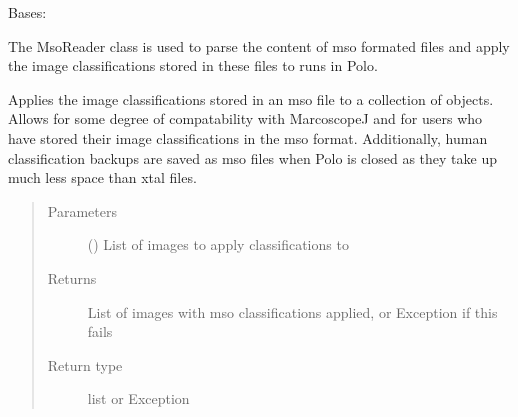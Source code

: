 \documentclass[letterpaper,10pt,english]{sphinxmanual}
\begin{document}

\begin{fulllineitems}
\label{\detokenize{polo.utils:polo.utils.io_utils.MsoReader}}
Bases: 

The MsoReader class is used to parse the content of mso formated
files and apply the image classifications stored in these files to
runs in Polo.

\begin{fulllineitems}
\label{\detokenize{polo.utils:polo.utils.io_utils.MsoReader.classify_images_from_mso_file}}
Applies the image classifications stored in an mso file to a
collection of {\hyperref[\detokenize{polo.crystallography:polo.crystallography.image.Image}]{}} objects.
Allows for some degree of compatability
with MarcoscopeJ and for users who have stored their image classifications
in the mso format. Additionally, human classification backups are
saved as mso files when Polo is closed as they take up much less
space than xtal files.
\begin{quote}\begin{description}
\item[{Parameters}] \leavevmode
{} () \textendash{} List of images to apply classifications to

\item[{Returns}] \leavevmode
List of images with mso classifications applied,
or Exception if this fails

\item[{Return type}] \leavevmode
list or Exception

\end{description}\end{quote}

\end{fulllineitems}


\end{fulllineitems}
\end{document}
